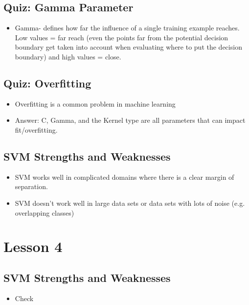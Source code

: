 \documentclass[12pt]{report}
\begin{document}
\subsection{Quiz: Gamma Parameter}

\begin{itemize}

\item Gamma- defines how far the influence of a single training example reaches. Low values = far reach (even the points far from the potential decision boundary get taken into account when evaluating where to put the decision boundary) and high values = close. 

\end{itemize}

\subsection{Quiz: Overfitting}

\begin{itemize}

\item Overfitting is a common problem in machine learning

\item Answer: C, Gamma, and the Kernel type are all parameters that can impact fit/overfitting.

\end{itemize}

\subsection{SVM Strengths and Weaknesses}

\begin{itemize}

\item SVM works well in complicated domains where there is a clear margin of separation.

\item SVM doesn't work well in large data sets or data sets with lots of noise (e.g. overlapping classes)

\end{itemize}


\section{Lesson 4}
\subsection{SVM Strengths and Weaknesses}

\begin{itemize}

\item Check

\end{itemize}
\end{document}
